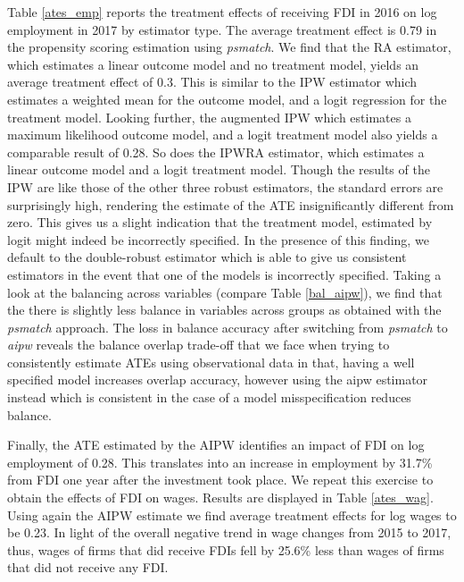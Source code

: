 Table \ref{ates_emp} reports the treatment effects of receiving FDI in 2016 on log employment in 2017 by estimator type. The average treatment effect is 0.79 in the propensity scoring estimation using \textit{psmatch}. We find that the RA estimator, which estimates a linear outcome model and no treatment model, yields an average treatment effect of 0.3. This is similar to the IPW estimator which estimates a weighted mean for the outcome model, and a logit regression for the treatment model. Looking further, the augmented IPW which estimates a maximum likelihood outcome model, and a logit treatment model also yields a comparable result of 0.28. So does the IPWRA estimator, which estimates a linear outcome model and a logit treatment model. Though the results of the IPW are like those of the other three robust estimators, the standard errors are surprisingly high, rendering the estimate of the ATE insignificantly different from zero. This gives us a slight indication that the treatment model, estimated by logit might indeed be incorrectly specified. In the presence of this finding, we default to the double-robust estimator which is able to give us consistent estimators in the event that one of the models is incorrectly specified. Taking a look at the balancing across variables (compare Table \ref{bal_aipw}), we find that the there is slightly less balance in variables across groups as obtained with the \textit{psmatch} approach. The loss in balance accuracy after switching from \textit{psmatch} to \textit{aipw} reveals the balance overlap trade-off that we face when trying to consistently estimate ATEs using observational data in that, having a well specified model increases overlap accuracy, however using the aipw estimator instead which is consistent in the case of a model misspecification reduces balance. \\ \par 

Finally, the ATE estimated by the AIPW identifies an impact of FDI on log employment of 0.28. This translates into an increase in employment by 31.7\% from FDI one year after the investment took place. We repeat this exercise to obtain the effects of FDI on wages. Results are displayed in Table \ref{ates_wag}. Using again the AIPW estimate we find average treatment effects for log wages to be 0.23. In light of the overall negative trend in wage changes from 2015 to 2017, thus, wages of firms that did receive FDIs fell by 25.6\% less than wages of firms that did not receive any FDI.\\ \par



